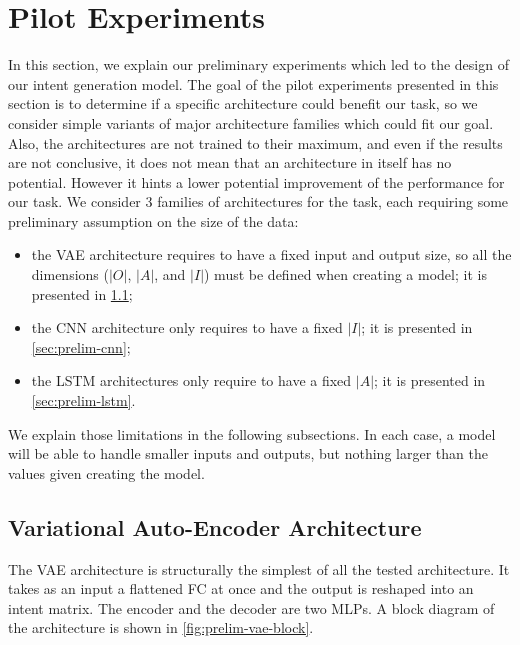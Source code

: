 \section{Pilot Experiments}\label{sec:prelim}
In this section, we explain our preliminary experiments which led to the design of our intent generation model.
The goal of the pilot experiments presented in this section is to determine if a specific architecture could benefit our task, so we consider simple variants of major architecture families which could fit our goal. Also, the architectures are not trained to their maximum, and even if the results are not conclusive, it does not mean that an architecture in itself has no potential. However it hints a lower potential improvement of the performance for our task.
We consider 3 families of architectures for the task, each requiring some preliminary assumption on the size of the data:
\begin{itemize}
    \item the VAE architecture requires to have a fixed input and output size, so all the dimensions ($|O|$, $|A|$, and $|I|$) must be defined when creating a model; it is presented in \cref{sec:prelim-vae};
    \item the CNN architecture only requires to have a fixed $|I|$; it is presented in \cref{sec:prelim-cnn};
    \item the LSTM architectures only require to have a fixed $|A|$; it is presented in \cref{sec:prelim-lstm}.
\end{itemize}
We explain those limitations in the following subsections.
In each case, a model will be able to handle smaller inputs and outputs, but nothing larger than the values given creating the model.



\subsection{Variational Auto-Encoder Architecture}\label{sec:prelim-vae}
The VAE architecture is structurally the simplest of all the tested architecture.
It takes as an input a flattened FC at once and the output is reshaped into an intent matrix.
The encoder and the decoder are two MLPs. A block diagram of the architecture is shown in \cref{fig:prelim-vae-block}.

